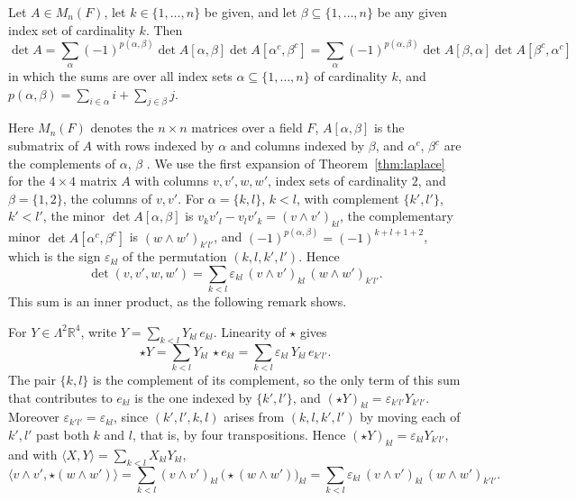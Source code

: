 \begin{theorem}
  \label{thm:laplace}
  Let $A \in M_{n}(F)$, let $k \in \{1, \ldots, n\}$ be given, and let
  $\beta \subseteq \{1, \ldots, n\}$ be any given index set of cardinality $k$.
  Then
  \[
    \det A = \sum_{\alpha} (-1)^{p(\alpha,\beta)} \det A[\alpha, \beta]
      \det A[\alpha^{c}, \beta^{c}]
    = \sum_{\alpha} (-1)^{p(\alpha,\beta)} \det A[\beta, \alpha]
      \det A[\beta^{c}, \alpha^{c}]
  \]
  in which the sums are over all index sets $\alpha \subseteq \{1, \ldots, n\}$
  of cardinality $k$, and
  $p(\alpha, \beta) = \sum_{i \in \alpha} i + \sum_{j \in \beta} j$.
\end{theorem}

Here $M_{n}(F)$ denotes the $n \times n$ matrices over a field $F$,
$A[\alpha, \beta]$ is the submatrix of $A$ with rows indexed by $\alpha$ and
columns indexed by $\beta$, and $\alpha^{c}$, $\beta^{c}$ are the complements
of $\alpha$, $\beta$ \cite[Section~0.7.1]{horn-johnson-2013}. We use the first
expansion of Theorem~\ref{thm:laplace} for the $4 \times 4$ matrix $A$ with columns $v, v', w, w'$, index
sets of cardinality $2$, and $\beta = \{1, 2\}$, the columns of $v, v'$. For
$\alpha = \{k, l\}$, $k < l$, with complement $\{k', l'\}$, $k' < l'$, the
minor $\det A[\alpha, \beta]$ is $v_{k}v'_{l} - v_{l}v'_{k} =
(v \wedge v')_{kl}$, the complementary minor $\det A[\alpha^{c}, \beta^{c}]$
is $(w \wedge w')_{k'l'}$, and $(-1)^{p(\alpha, \beta)} = (-1)^{k + l + 1 + 2}$,
which is the sign $\varepsilon_{kl}$ of the permutation $(k, l, k', l')$.
Hence
\[
  \det(v, v', w, w')
  = \sum_{k<l} \varepsilon_{kl}\,(v \wedge v')_{kl}\,(w \wedge w')_{k'l'}.
\]
This sum is an inner product, as the following remark shows.

\begin{remark}
  \label{rem:starcoord}
  For $Y \in \Lambda^{2}\mathbb{R}^{4}$, write $Y = \sum_{k<l} Y_{kl}\, e_{kl}$.
  Linearity of $\star$ gives
  \[
    \star Y = \sum_{k<l} Y_{kl}\, \star e_{kl}
    = \sum_{k<l} \varepsilon_{kl}\, Y_{kl}\, e_{k'l'}.
  \]
  The pair $\{k, l\}$ is the complement of its complement, so the only term of
  this sum that contributes to $e_{kl}$ is the one indexed by $\{k', l'\}$, and
  $(\star Y)_{kl} = \varepsilon_{k'l'} Y_{k'l'}$. Moreover $\varepsilon_{k'l'} =
  \varepsilon_{kl}$, since $(k', l', k, l)$ arises from $(k, l, k', l')$ by
  moving each of $k', l'$ past both $k$ and $l$, that is, by four
  transpositions. Hence $(\star Y)_{kl} = \varepsilon_{kl} Y_{k'l'}$, and with
  $\langle X, Y\rangle = \sum_{k<l} X_{kl} Y_{kl}$,
  \[
    \langle v \wedge v', \star(w \wedge w')\rangle
    = \sum_{k<l} (v \wedge v')_{kl}\, \bigl(\star(w \wedge w')\bigr)_{kl}
    = \sum_{k<l} \varepsilon_{kl}\,(v \wedge v')_{kl}\,(w \wedge w')_{k'l'}.
  \]
\end{remark}

